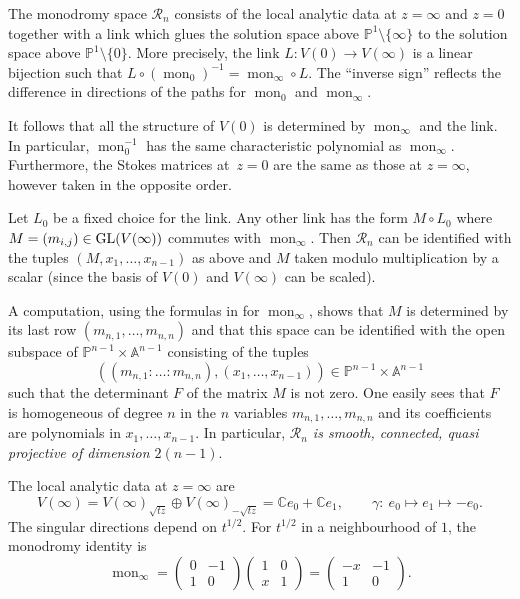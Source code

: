 \documentclass[pdftex]{sigma}
\numberwithin{equation}{section}
\begin{document}
The monodromy space $\mathcal{R}_n$ consists of the local analytic data at $z=\infty$ and $z=0$ together with
a link which glues the solution space above $\mathbb{P}^1\setminus \{\infty \}$ to the solution space
above $\mathbb{P}^1\setminus \{0\}$. More precisely, the link $L\colon V(0)\rightarrow V(\infty)$ is a linear bijection such that
$L\circ (\operatorname{mon}_0)^{-1}=\operatorname{mon}_\infty \circ L$. The ``inverse sign'' reflects the difference in directions of the paths for
$\operatorname{mon}_0$ and $\operatorname{mon}_\infty$.


 It follows that all the structure of $V(0)$ is determined by $\operatorname{mon}_\infty$ and the link. In particular, $\operatorname{mon}_0^{-1}$ has the same characteristic polynomial as $\operatorname{mon}_\infty$. Furthermore, the Stokes matrices at~${z=0}$ are the same as those at $z=\infty$, however taken in the opposite order.


Let $L_0$ be a fixed choice for the link. Any other link has the form $M\circ L_0$ where
$M=(m_{i,j})\in {\rm GL}(V(\infty))$ commutes with $\operatorname{mon}_\infty$. Then $\mathcal{R}_n$ can be identified with the tuples $(M,x_1,\dots ,x_{n-1})$ as above and $M$ taken modulo multiplication by a scalar (since the basis of $V(0)$ and $V(\infty)$ can be
 scaled).

A computation, using the formulas in \cite[Sections~3.3 and~3.4]{CM-vdP} for $\operatorname{mon}_\infty$, shows that $M$ is determined by its last
row $(m_{n,1},\dots ,m_{n,n})$ and that this space
can be identified with the open subspace of $\mathbb{P}^{n-1}\times \mathbb{A}^{n-1}$ consisting
of the tuples
\[((m_{n,1}:\dots :m_{n,n}),(x_1,\dots ,x_{n-1}))\in \mathbb{P}^{n-1}\times \mathbb{A}^{n-1}\]
 such that
the determinant $F$ of the matrix $M$ is not zero. One easily sees that $F$ is homogeneous of degree
$n$ in the $n$ variables $m_{n,1},\dots ,m_{n,n}$ and its coefficients are polynomials in $x_1,\dots ,x_{n-1}$.
In particular, {\it $\mathcal{R}_n$ is smooth, connected, quasi projective of dimension $2(n-1)$}.

\begin{Example} The local analytic data at $z=\infty$ are
\[
V(\infty)=V(\infty)_{\sqrt{tz}}\oplus V(\infty)_{-\sqrt{tz}}=\mathbb{C}e_0+\mathbb{C}e_1,\qquad
\gamma \colon\ e_0\mapsto e_1 \mapsto -e_0.
\]
The singular directions depend on $t^{1/2}$. For $t^{1/2}$ in a neighbourhood
of $1$, the monodromy identity is
\[\operatorname{mon}_\infty= \left(\begin{matrix}0 & -1\\ 1 & 0\end{matrix}\right)\left(\begin{matrix}1&0\\ x & 1\end{matrix}\right) =
\left(\begin{matrix}-x &-1\\ 1 & 0\end{matrix}\right).
\]
\end{Example}
\end{document}
